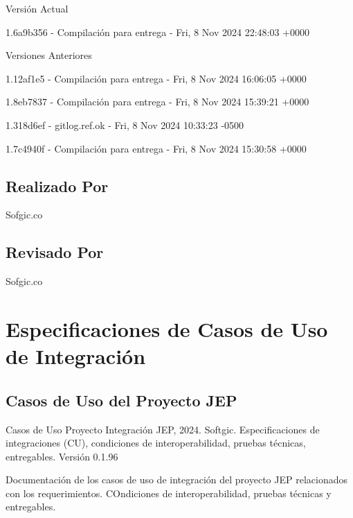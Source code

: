 \documentclass[
  paper=a4,
  ,captions=tableheading
]{scrartcl}
\renewenvironment{quote}{\begin{customblockquote}\list{}{\rightmargin=0em\leftmargin=0em}%
\item\relax\color{blockquote-text}\ignorespaces}{\unskip\unskip\endlist\end{customblockquote}}
\begin{document}
\begin{quote}
\end{quote}

Versión Actual

1.6a9b356 - Compilación para entrega - Fri, 8 Nov 2024 22:48:03 +0000

Versiones Anteriores

1.12af1e5 - Compilación para entrega - Fri, 8 Nov 2024 16:06:05 +0000

1.8eb7837 - Compilación para entrega - Fri, 8 Nov 2024 15:39:21 +0000

1.318d6ef - gitlog.ref.ok - Fri, 8 Nov 2024 10:33:23 -0500

1.7c4940f - Compilación para entrega - Fri, 8 Nov 2024 15:30:58 +0000

\subsection{Realizado Por}\label{sec:realizado-por}

Sofgic.co

\subsection{Revisado Por}\label{sec:revisado-por}

Sofgic.co

\newpage

\section{Especificaciones de Casos de Uso de
Integración}\label{sec:especificaciones-de-casos-de-uso-de-integraciuxf3n}

\subsection{Casos de Uso del Proyecto
JEP}\label{sec:casos-de-uso-del-proyecto-jep}

\begin{quote}
Casos de Uso Proyecto Integración JEP, 2024. Softgic. Especificaciones
de integraciones (CU), condiciones de interoperabilidad, pruebas
técnicas, entregables. Versión 0.1.96
\end{quote}

Documentación de los casos de uso de integración del proyecto JEP
relacionados con los requerimientos. COndiciones de interoperabilidad,
pruebas técnicas y entregables.
\end{document}
